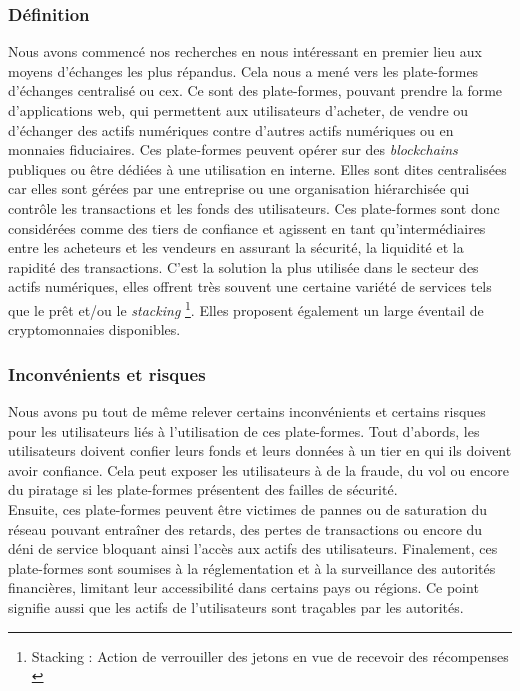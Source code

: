 \subsubsection{Définition}
Nous avons commencé nos recherches en nous intéressant en premier lieu aux moyens d'échanges les plus répandus. 
Cela nous a mené vers les plate-formes d'échanges centralisé ou \acrshort{cex}. 
Ce sont des plate-formes, pouvant prendre la forme d'applications web, qui permettent aux utilisateurs d'acheter, de vendre ou d'échanger des \gls{actif}s numériques contre d'autres \gls{actif}s numériques ou en monnaies fiduciaires. 
Ces plate-formes peuvent opérer sur des \textit{\gls{blockchain}s} publiques ou être dédiées à une utilisation en interne. 
Elles sont dites centralisées car elles sont gérées par une entreprise ou une organisation hiérarchisée qui contrôle les transactions et les fonds des utilisateurs.
Ces plate-formes sont donc considérées comme des tiers de confiance et agissent en tant qu'intermédiaires entre les acheteurs et les vendeurs en assurant la sécurité, la liquidité et la rapidité des transactions.
C'est la solution la plus utilisée dans le secteur des \gls{actif}s numériques, elles offrent très souvent une certaine variété de services tels que le prêt et/ou le \textit{stacking} \footnote{Stacking : Action de verrouiller des jetons en vue de recevoir des récompenses \cite{defStack}}.
Elles proposent également un large éventail de cryptomonnaies disponibles.

\subsubsection{Inconvénients et risques}
Nous avons pu tout de même relever certains inconvénients et certains risques pour les utilisateurs liés à l'utilisation de ces plate-formes. 
Tout d'abords, les utilisateurs doivent confier leurs fonds et leurs données à un tier en qui ils doivent avoir confiance. 
Cela peut exposer les utilisateurs à de la fraude, du vol ou encore du piratage si les plate-formes présentent des failles de sécurité. \\
Ensuite, ces plate-formes peuvent être victimes de pannes ou de saturation du réseau pouvant entraîner des retards, des pertes de transactions ou encore du déni de service bloquant ainsi l'accès aux \gls{actif}s des utilisateurs. 
Finalement, ces plate-formes sont soumises à la réglementation et à la surveillance des autorités financières, limitant leur accessibilité dans certains pays ou régions. 
Ce point signifie aussi que les \gls{actif}s de l'utilisateurs sont traçables par les autorités. 


